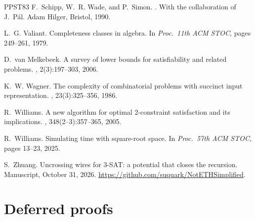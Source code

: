 \documentclass[11pt]{article}
\theoremstyle{definition}
\theoremstyle{definition}
\theoremstyle{remark}
\begin{document}
\begin{thebibliography}{PPST83}
F.~Schipp, W.~R. Wade, and P.~Simon.
.
\newblock With the collaboration of J.~P\'al. Adam Hilger, Bristol, 1990.

L.~G. Valiant.
\newblock Completeness classes in algebra.
\newblock In {\em Proc.\ 11th ACM STOC}, pages 249--261, 1979.

D.~van Melkebeek.
\newblock A survey of lower bounds for satisfiability and related problems.
, 2(3):197--303, 2006.

K.~W. Wagner.
\newblock The complexity of combinatorial problems with succinct input representation.
, 23(3):325--356, 1986.

R.~Williams.
\newblock A new algorithm for optimal 2-constraint satisfaction and its implications.
, 348(2--3):357--365, 2005.

R.~Williams.
\newblock Simulating time with square-root space.
\newblock In {\em Proc.\ 57th ACM STOC}, pages 13--23, 2025.

S.~Zhuang.
\newblock Uncrossing wires for 3-{SAT}: a potential that closes the recursion.
\newblock Manuscript, October 31, 2026. \url{https://github.com/suquark/NotETHSimplified}.

\end{thebibliography}
\appendix

\section{Deferred proofs}\label{app:proofs}
\end{document}
